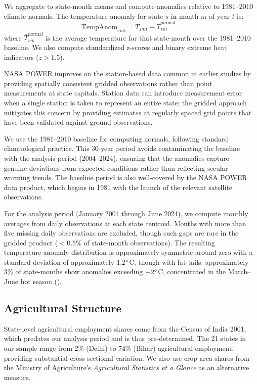 \documentclass[12pt]{article}
\begin{document}
We aggregate to state-month means and compute anomalies relative to 1981--2010 climate normals. The temperature anomaly for state $s$ in month $m$ of year $t$ is:
\begin{equation}
\text{TempAnom}_{smt} = \bar{T}_{smt} - \bar{T}_{sm}^{\text{normal}}
\end{equation}
where $\bar{T}_{sm}^{\text{normal}}$ is the average temperature for that state-month over the 1981--2010 baseline. We also compute standardized z-scores and binary extreme heat indicators ($z > 1.5$).

NASA POWER improves on the station-based data common in earlier studies \citep{auffhammer2013using} by providing spatially consistent gridded observations rather than point measurements at state capitals. Station data can introduce measurement error when a single station is taken to represent an entire state; the gridded approach mitigates this concern by providing estimates at regularly spaced grid points that have been validated against ground observations.

We use the 1981--2010 baseline for computing normals, following standard climatological practice. This 30-year period avoids contaminating the baseline with the analysis period (2004--2024), ensuring that the anomalies capture genuine deviations from expected conditions rather than reflecting secular warming trends. The baseline period is also well-covered by the NASA POWER data product, which begins in 1981 with the launch of the relevant satellite observations.

For the analysis period (January 2004 through June 2024), we compute monthly averages from daily observations at each state centroid. Months with more than five missing daily observations are excluded, though such gaps are rare in the gridded product ($<0.5\%$ of state-month observations). The resulting temperature anomaly distribution is approximately symmetric around zero with a standard deviation of approximately 1.2$\degree$C, though with fat tails: approximately 3\% of state-months show anomalies exceeding $+2\degree$C, concentrated in the March--June hot season ().

\subsection{Agricultural Structure}

State-level agricultural employment shares come from the Census of India 2001, which predates our analysis period and is thus pre-determined. The 21 states in our sample range from 2\% (Delhi) to 74\% (Bihar) agricultural employment, providing substantial cross-sectional variation. We also use crop area shares from the Ministry of Agriculture's \textit{Agricultural Statistics at a Glance} as an alternative measure.
\end{document}
